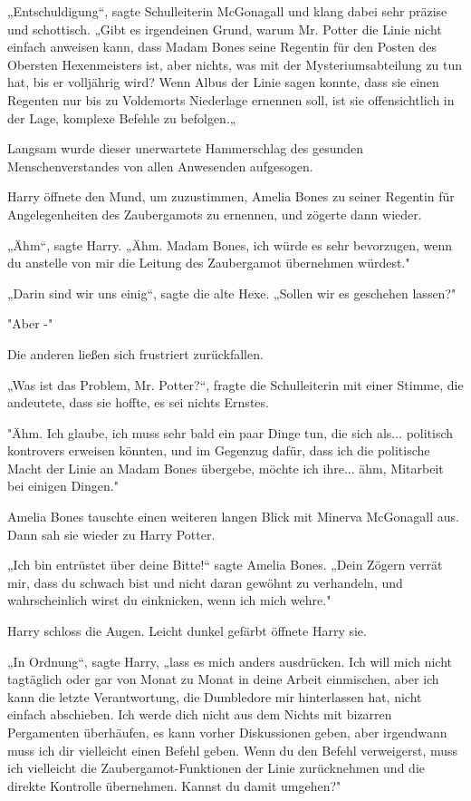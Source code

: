 {„Entschuldigung“, sagte Schulleiterin McGonagall und klang dabei sehr präzise und schottisch. „Gibt es irgendeinen Grund, warum Mr. Potter die Linie nicht einfach anweisen kann, dass Madam Bones seine Regentin für den Posten des Obersten Hexenmeisters ist, aber nichts, was mit der Mysteriumsabteilung zu tun hat, bis er volljährig wird? Wenn Albus der Linie sagen konnte, dass sie einen Regenten nur bis zu Voldemorts Niederlage ernennen soll, ist sie offensichtlich in der Lage, komplexe Befehle zu befolgen.„

Langsam wurde dieser unerwartete Hammerschlag des gesunden Menschenverstandes von allen Anwesenden aufgesogen.

Harry öffnete den Mund, um zuzustimmen, Amelia Bones zu seiner Regentin für Angelegenheiten des Zaubergamots zu ernennen, und zögerte dann wieder.

„Ähm“, sagte Harry. „Ähm. Madam Bones, ich würde es sehr bevorzugen, wenn du anstelle von mir die Leitung des Zaubergamot übernehmen würdest."

„Darin sind wir uns einig“, sagte die alte Hexe. „Sollen wir es geschehen lassen?"

"Aber -"

Die anderen ließen sich frustriert zurückfallen.

„Was ist das Problem, Mr. Potter?“, fragte die Schulleiterin mit einer Stimme, die andeutete, dass sie hoffte, es sei nichts Ernstes.

"Ähm. Ich glaube, ich muss sehr bald ein paar Dinge tun, die sich als... politisch kontrovers erweisen könnten, und im Gegenzug dafür, dass ich die politische Macht der Linie an Madam Bones übergebe, möchte ich ihre... ähm, Mitarbeit bei einigen Dingen."

Amelia Bones tauschte einen weiteren langen Blick mit Minerva McGonagall aus.\\ Dann sah sie wieder zu Harry Potter.

„Ich bin entrüstet über deine Bitte!“ sagte Amelia Bones. „Dein Zögern verrät mir, dass du schwach bist und nicht daran gewöhnt zu verhandeln, und wahrscheinlich wirst du einknicken, wenn ich mich wehre."

Harry schloss die Augen. Leicht dunkel gefärbt öffnete Harry sie.

„In Ordnung“, sagte Harry, „lass es mich anders ausdrücken. Ich will mich nicht tagtäglich oder gar von Monat zu Monat in deine Arbeit einmischen, aber ich kann die letzte Verantwortung, die Dumbledore mir hinterlassen hat, nicht einfach abschieben. Ich werde dich nicht aus dem Nichts mit bizarren Pergamenten überhäufen, es kann vorher Diskussionen geben, aber irgendwann muss ich dir vielleicht einen Befehl geben. Wenn du den Befehl verweigerst, muss ich vielleicht die Zaubergamot-Funktionen der Linie zurücknehmen und die direkte Kontrolle übernehmen. Kannst du damit umgehen?"

}

